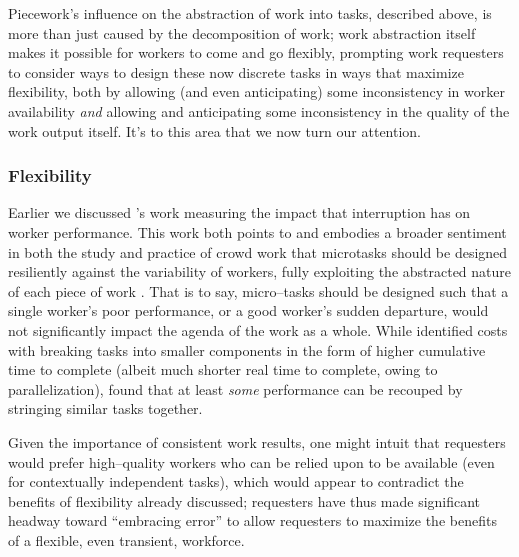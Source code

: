 \documentclass[trackingWork]{subfiles}
\begin{document}
Piecework's influence on the abstraction of work into tasks,
described above, is more than just caused by the decomposition of work;
work abstraction itself makes it possible for workers to come and go flexibly,
prompting work requesters to consider ways to design these now discrete tasks in ways that
maximize flexibility, both by allowing (and even anticipating) some inconsistency in worker availability
\textit{and} allowing and anticipating some inconsistency in the quality of the work output itself.
It's to this area that we now turn our attention.










\subsubsection{Flexibility}\label{sec:flexibility}

Earlier we discussed \citeauthor{cheng2015break}'s work
measuring the impact that interruption has on worker performance.
This work both points to and embodies a broader sentiment in
both the study and practice
of crowd work that microtasks should be designed resiliently against the variability of workers,
fully exploiting the abstracted nature of each piece of work
\cite{interruptionIqbal,delayAndOrderLasecki,vaish2014low}.
That is to say, micro--tasks should be designed such that a single worker's poor performance,
or a good worker's sudden departure,
would not significantly impact the agenda of the work as a whole.
While \citeauthor{cheng2015break} identified costs with breaking tasks into smaller components
in the form of higher cumulative time to complete
(albeit much shorter real time to complete, owing to parallelization),
\citeauthor{delayAndOrderLasecki} found that at least \textit{some} performance can be recouped by stringing 
similar tasks together.


Given the importance of consistent work results, one might intuit that
requesters would prefer high--quality workers who can be relied upon to be available
(even for contextually independent tasks),
which would appear to contradict the benefits of flexibility already discussed;
requesters have thus made significant headway toward
``embracing error'' to allow requesters to maximize the benefits of a flexible,
even transient,
workforce.
\end{document}
